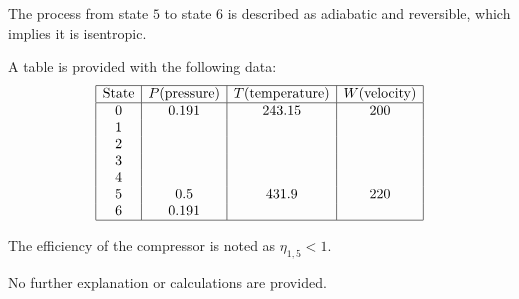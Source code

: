 The process from state \( 5 \) to state \( 6 \) is described as adiabatic and reversible, which implies it is isentropic.  

A table is provided with the following data:  
\[
\begin{array}{|c|c|c|c|}
\hline
\text{State} & P (\text{pressure}) & T (\text{temperature}) & W (\text{velocity}) \\
\hline
0 & 0.191 & 243.15 & 200 \\
1 & & & \\
2 & & & \\
3 & & & \\
4 & & & \\
5 & 0.5 & 431.9 & 220 \\
6 & 0.191 & & \\
\hline
\end{array}
\]

The efficiency of the compressor is noted as \( \eta_{1,5} < 1 \).  

No further explanation or calculations are provided.
